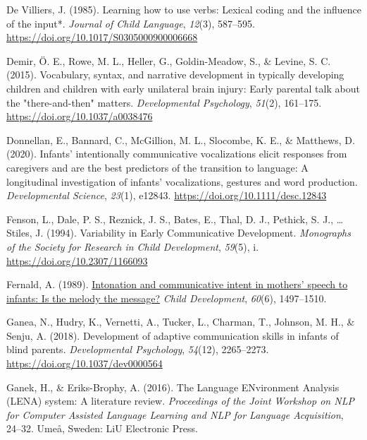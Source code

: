 \documentclass[
  man,floatsintext]{apa6}
\newlength{\cslhangindent}
\newlength{\cslentryspacingunit} %
\newenvironment{CSLReferences}[2] %
 {%
  \setlength{\parindent}{0pt}
  \ifodd #1
  \let\oldpar\par
  \def\par{\hangindent=\cslhangindent\oldpar}
  \fi
  \setlength{\parskip}{#2\cslentryspacingunit}
 }%
 {}
\begin{document}
\begin{CSLReferences}{1}{0}
\leavevmode{}%
De Villiers, J. (1985). Learning how to use verbs: Lexical coding and the influence of the input*. \emph{Journal of Child Language}, \emph{12}(3), 587--595. \url{https://doi.org/10.1017/S0305000900006668}

\leavevmode{}%
Demir, Ö. E., Rowe, M. L., Heller, G., Goldin-Meadow, S., \& Levine, S. C. (2015). Vocabulary, syntax, and narrative development in typically developing children and children with early unilateral brain injury: Early parental talk about the "there-and-then" matters. \emph{Developmental Psychology}, \emph{51}(2), 161--175. \url{https://doi.org/10.1037/a0038476}

\leavevmode{}%
Donnellan, E., Bannard, C., McGillion, M. L., Slocombe, K. E., \& Matthews, D. (2020). Infants' intentionally communicative vocalizations elicit responses from caregivers and are the best predictors of the transition to language: {A} longitudinal investigation of infants' vocalizations, gestures and word production. \emph{Developmental Science}, \emph{23}(1), e12843. \url{https://doi.org/10.1111/desc.12843}

\leavevmode{}%
Fenson, L., Dale, P. S., Reznick, J. S., Bates, E., Thal, D. J., Pethick, S. J., \ldots{} Stiles, J. (1994). Variability in {Early Communicative Development}. \emph{Monographs of the Society for Research in Child Development}, \emph{59}(5), i. \url{https://doi.org/10.2307/1166093}

\leavevmode{}%
Fernald, A. (1989). \href{https://www.ncbi.nlm.nih.gov/pubmed/2612255}{Intonation and communicative intent in mothers' speech to infants: Is the melody the message?} \emph{Child Development}, \emph{60}(6), 1497--1510.

\leavevmode{}%
Ganea, N., Hudry, K., Vernetti, A., Tucker, L., Charman, T., Johnson, M. H., \& Senju, A. (2018). Development of adaptive communication skills in infants of blind parents. \emph{Developmental Psychology}, \emph{54}(12), 2265--2273. \url{https://doi.org/10.1037/dev0000564}

\leavevmode{}%
Ganek, H., \& Eriks-Brophy, A. (2016). The {Language ENvironment Analysis} ({LENA}) system: {A} literature review. \emph{Proceedings of the Joint Workshop on {NLP} for {Computer Assisted Language Learning} and {NLP} for {Language Acquisition}}, 24--32. {Umeå, Sweden}: {LiU Electronic Press}.


\end{CSLReferences}
\end{document}
